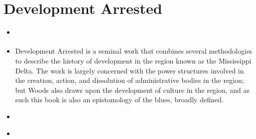 \documentclass{article}
\begin{document}
\section{Development Arrested}
\begin{itemize}

\item \cite{woods2017DevelopmentArrested}
\item Development Arrested is a seminal work that combines several methodologies to describe the history of development in the region known as the Mississippi Delta. The work is largely concerned with the power structures involved in the creation, action, and dissolution of administrative bodies in the region; but Woods also draws upon the development of culture in the region, and as such this book is also an epistomology of the blues, broadly defined.

\item \cite{isenberg2004SymposiumWoods}

\item \cite{tiefenbacher2019DevelopmentArrested}
\end{itemize}



\end{document}
